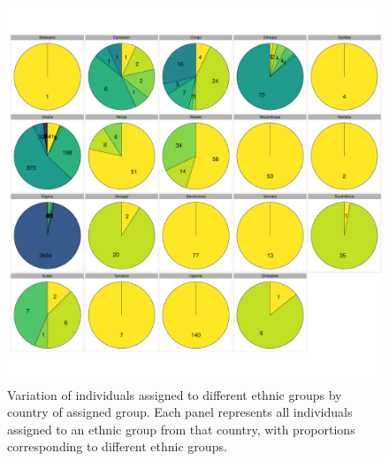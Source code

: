 \begin{figure}[htp]
    \centering
    \includegraphics[width=1.0\textwidth]{../images/chapter3/all_countries_SF_props_pie_chart.pdf}
    \caption{Variation of individuals assigned to different ethnic groups by country of assigned group. Each panel represents all individuals assigned to an ethnic group from that country, with proportions corresponding to different ethnic groups.}
    \label{fig:all_countries_SF_props_pie_chart}
\end{figure}


